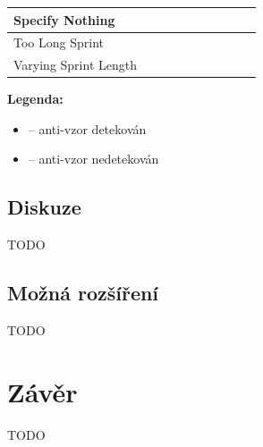 \documentclass[czech,DP]{thesiskiv}
\newcommand{\cmark}{\ding{51}}%
\newcommand{\xmark}{\ding{55}}%
\begin{document}
\begin{landscape}
\begin{table}[]
\begin{tabular}{|l||c|c|c|c|c|c|c|c|c|}
Specify Nothing&\cmark&\xmark&\xmark&\cmark&\xmark&\xmark&\xmark&\xmark&\xmark\\ \hline
Too Long Sprint&\cmark&\xmark&\cmark&\xmark&\xmark&\xmark&\xmark&\cmark&\cmark\\ \hline
Varying Sprint Length&\xmark&\xmark&\xmark&\xmark&\xmark&\xmark&\xmark&\cmark&\xmark\\ \hline
\end{tabular}
\end{table}
\textbf{Legenda:}
\begin{itemize}
    \item \cmark -- anti-vzor detekován
    \item \xmark -- anti-vzor nedetekován
\end{itemize}
\FloatBarrier
\end{landscape}
\section{Diskuze}
TODO
\section{Možná rozšíření}
TODO
\chapter{Závěr}
TODO
 

{\raggedright\small

}
\end{document}
